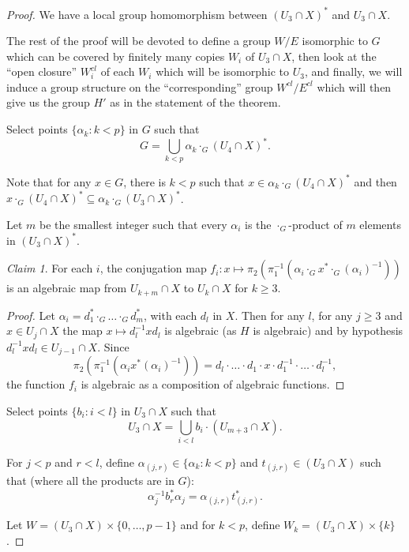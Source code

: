 \documentclass[12pt]{article}
\theoremstyle{definition}
\theoremstyle{mystyle}
\theoremstyle{remark}
\newtheorem*{claim}{Claim}
\newenvironment{claimproof}
    {\begin{proof}}{\renewcommand\qedsymbol{\Squarepipe} \end{proof}}
\begin{document}
\begin{proof}
We have a local group homomorphism between $(U_3\cap X)^*$ and
$U_3\cap X$.

The rest of the proof will be devoted to define a group $W/E$
isomorphic to $G$ which can be covered by finitely many copies
$W_i$ of $U_3\cap X$, then look at the ``open closure'' $W_i^{cl}$
of each $W_i$ which will be isomorphic to $U_3$, and finally, we
will induce a group structure on the ``corresponding'' group
$ W^{cl}/E^{cl}$ which will then give us the group $H'$
as in the statement of the theorem.


Select points $\{\alpha_k :k<p\}$ in $G$ such that \[G =
\displaystyle{\bigcup_{k<p} \alpha_k \cdot_G (U_4\cap X)^*}.\]%

Note that for any $x\in G$, there is $k<p$ such that $x\in \alpha_k \cdot_G (U_4\cap X)^*$ and then $x\cdot_G (U_4\cap X)^{*}\subseteq \alpha_k \cdot_G (U_3 \cap X)^{*}$.

Let $m$ be the smallest integer such that every $\alpha_i$ is the
$\cdot_G$-product of $m$ elements in $(U_3\cap X)^*$.
\bigskip

\begin{claim} For each $i$, the conjugation map $f_{i}: x\mapsto
\pi_2(\pi_1^{-1}(\alpha_i\cdot_G x^*\cdot_G (\alpha_i)^{-1}))$ is
an algebraic map from $U_{k+m}\cap X$ to $U_{k}\cap X$ for
$k\geq 3$.
\end{claim}

\begin{claimproof} Let $\alpha_i=d_1^*\cdot_G \dots \cdot_G d_m^*$, with each $d_l$ in $X$. Then for any $l$,
for any $j\geq 3$ and $x\in U_j\cap X$ the map $x\mapsto d_l^{-1} x d_l$
is algebraic (as $H$ is algebraic) and by
hypothesis $d_l^{-1} x d_l\in U_{j-1}\cap X$. Since
\[
\pi_2(\pi_1^{-1}(\alpha_i x^* (\alpha_i)^{-1}))=d_l\cdot \dots
\cdot d_1\cdot x \cdot d_1^{-1} \cdot \dots \cdot d_l^{-1},
\]
the function $f_i$ is algebraic as a composition of algebraic functions.
\end{claimproof}


Select points $\{b_i :i<l\}$ in $U_3\cap X$ such that \[U_3\cap X
=\displaystyle{\bigcup_{i<l} b_i \cdot (U_{m+3}\cap X)}.\]

For $j<p$ and $r<l$, define $\alpha_{(j,r)}\in \{\alpha_k:k<p\}$ and $t_{(j,r)}\in (U_3 \cap X)$ such that (where all the products are in $G$):
\[
\alpha_j^{-1} b_r^{*}  \alpha_j = \alpha_{(j,r)} t^{*}_{(j,r)}.
\]


Let $W=(U_3 \cap X) \times \{0,\ldots, p-1\}$ and for $k<p$,
define $W_k = (U_3\cap X) \times \{k\}$.


\end{proof}
\end{document}
